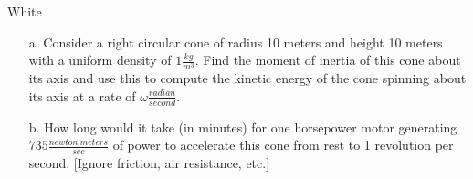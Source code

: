 \documentclass[titlepage]{article}
\begin{document}
\begin{cproblem}{3}{White}
\ \\ \vspace{-2em}
\begin{itemize}
\item[a.] Consider a right circular cone of radius 10 meters and height 10 meters with a uniform density of $1\frac{kg}{m^3}$. Find the moment of inertia of this cone about its axis and use this to compute the kinetic energy of the cone spinning about its axis at a rate of $\omega\frac{radian}{second}$.
\item[b.] How long would it take (in minutes) for one horsepower motor generating $735\frac{newton\ meters}{sec}$ of power to accelerate this cone from rest to 1 revolution per second. [Ignore friction, air resistance, etc.]
\end{itemize}
\end{cproblem}
\end{document}
